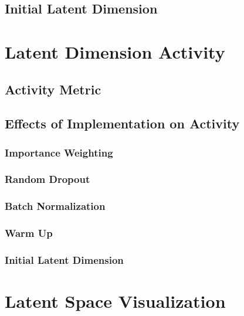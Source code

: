 \documentclass{article} %
\begin{document}
\subsection{Initial Latent Dimension}

\section{Latent Dimension Activity}
\subsection{Activity Metric}
\subsection{Effects of Implementation on Activity}
\subsubsection{Importance Weighting}

\subsubsection{Random Dropout}


\subsubsection{Batch Normalization}

\subsubsection{Warm Up}

\subsubsection{Initial Latent Dimension}


\section{Latent Space Visualization}
\end{document}
